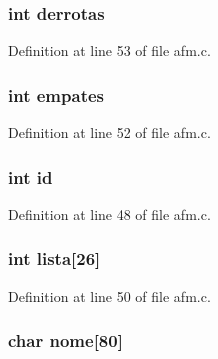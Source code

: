 \hypertarget{structequipa_aec0b9c1802275e055b4245b4d74e6733}{
\subsubsection[{derrotas}]{\setlength{\rightskip}{0pt plus 5cm}int {\bf derrotas}}}\label{structequipa_aec0b9c1802275e055b4245b4d74e6733}


\-Definition at line 53 of file afm.\-c.

\hypertarget{structequipa_a4ea65a038afceee592fe0b4a9eeebf98}{
\subsubsection[{empates}]{\setlength{\rightskip}{0pt plus 5cm}int {\bf empates}}}\label{structequipa_a4ea65a038afceee592fe0b4a9eeebf98}


\-Definition at line 52 of file afm.\-c.

\hypertarget{structequipa_a7441ef0865bcb3db9b8064dd7375c1ea}{
\subsubsection[{id}]{\setlength{\rightskip}{0pt plus 5cm}int {\bf id}}}\label{structequipa_a7441ef0865bcb3db9b8064dd7375c1ea}


\-Definition at line 48 of file afm.\-c.

\hypertarget{structequipa_ae4169594b69b603d4d756c4b127b58ec}{
\subsubsection[{lista}]{\setlength{\rightskip}{0pt plus 5cm}int {\bf lista}\mbox{[}26\mbox{]}}}\label{structequipa_ae4169594b69b603d4d756c4b127b58ec}


\-Definition at line 50 of file afm.\-c.

\hypertarget{structequipa_a2fe8d29936547b4ede632f419ea32367}{
\subsubsection[{nome}]{\setlength{\rightskip}{0pt plus 5cm}char {\bf nome}\mbox{[}80\mbox{]}}}\label{structequipa_a2fe8d29936547b4ede632f419ea32367}


